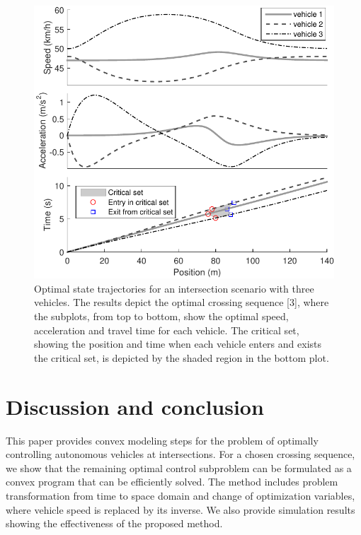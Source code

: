 \documentclass[letterpaper,10pt,conference]{ieeeconf}
\newlength \figwidth
\begin{document}
\begin{figure}[t]
\centering
\includegraphics[width=\figwidth]{figures//trajectories}
\caption{Optimal state trajectories for an intersection scenario with three vehicles. The results depict the optimal crossing sequence \mbox{[3]}, where the subplots, from top to bottom, show the optimal speed, acceleration and travel time for each vehicle. The critical set, showing the position and time when each vehicle enters and exists the critical set, is depicted by the shaded region in the bottom plot.}
\label{fig:trajectories} %
\end{figure}

\section{Discussion and conclusion} \label{sec:conclusion}

This paper provides convex modeling steps for the problem of optimally controlling autonomous vehicles at intersections. For a chosen crossing sequence, we show that the remaining optimal control subproblem can be formulated as a convex program that can be efficiently solved. The method includes problem transformation from time to space domain and change of optimization variables, where vehicle speed is replaced by its inverse. We also provide simulation results showing the effectiveness of the proposed method.
\end{document}
